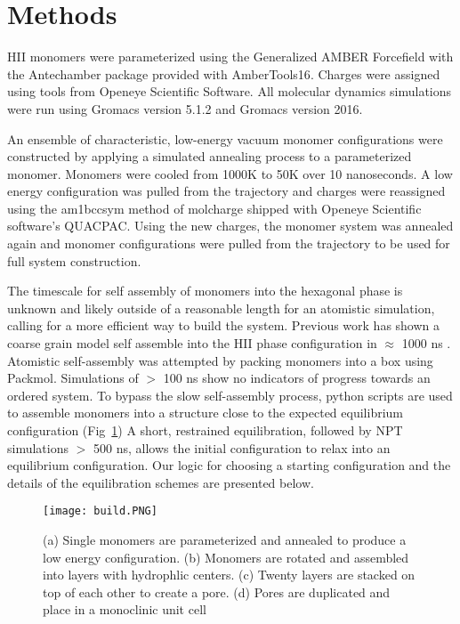 \section*{Methods}
	
HII monomers were parameterized using the Generalized AMBER Forcefield
\cite{wang_development_2004} with the Antechamber package\cite{wang_automatic_2006}
provided with AmberTools16\cite{case_ambertools16_2016}. Charges were
assigned using tools from Openeye Scientific Software. All molecular 
dynamics simulations were run using Gromacs version 5.1.2 and Gromacs 
version 2016. \cite{bekker_gromacs:_1993,berendse n_gromacs:_1995,
van_der_spoel_gromacs:_2005,hess_gromacs_2008}
	
An ensemble of characteristic, low-energy vacuum monomer configurations
were constructed by applying a simulated annealing process to a
parameterized monomer. Monomers were cooled from 1000K to 50K over 10
nanoseconds. A low energy configuration was pulled from the trajectory 
and charges were reassigned using the am1bccsym method of molcharge
shipped with Openeye Scientific software's QUACPAC. Using the new
charges, the monomer system was annealed again and monomer
configurations were pulled from the trajectory to be used for full
system construction.
	
The timescale for self assembly of monomers into the hexagonal phase is
unknown and likely outside of a reasonable length for an atomistic
simulation, calling for a more efficient way to build the system. 
Previous work has shown a coarse grain model self assemble into the HII
phase configuration in $\approx$ 1000 ns \cite{mondal_self-assembly_2013}.
Atomistic self-assembly was attempted by packing monomers into a box 
using Packmol\cite{martinez_packmol:_2009}. Simulations of $>$ 100 ns 
show no indicators of progress towards an ordered system. To bypass the
slow self-assembly process, python scripts are used to assemble 
monomers into a structure close to the expected equilibrium configuration (Fig~\ref{fig:python})
A short, restrained equilibration, followed by NPT simulations $>$ 500 ns, 
allows the initial configuration to relax into an equilibrium configuration.
Our logic for choosing a starting configuration and the details of the equilibration 
schemes are presented below. %

\begin{figure}
	\centering
	\texttt{[image: build.PNG]}
	\caption{(a) Single monomers are parameterized and annealed to produce a low energy
		configuration. (b) Monomers are rotated and assembled into layers with 
		hydrophlic centers. (c) Twenty layers are stacked on top of each other to create
		a pore. (d) Pores are duplicated and place in a monoclinic unit cell}\label{fig:python}
\end{figure}

